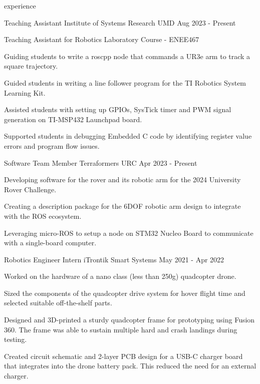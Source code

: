 \begin{section}{experience}

  \begin{work}
    {Teaching Assistant}
    {Institute of Systems Research}
    {UMD}
    {Aug 2023 - Present}

    \item Teaching Assistant for Robotics Laboratory Course - ENEE467
    \item Guiding students to write a roscpp node that commands a UR3e arm to track a square trajectory. 
    \item Guided students in writing a line follower program for the TI Robotics System Learning Kit.
    \item Assisted students with setting up GPIOs, SysTick timer and PWM signal generation on TI-MSP432 Launchpad board.
    \item Supported students in debugging Embedded C code by identifying register value errors and program flow issues.

  \end{work}

  \begin{work}
    {Software Team Member}
    {Terraformers URC}
    {}
    {Apr 2023 - Present}

    \item Developing software for the rover and its robotic arm for the 2024 University Rover Challenge.
    \item Creating a description package for the 6DOF robotic arm design to integrate with the ROS ecosystem.
    \item Leveraging micro-ROS to setup a node on STM32 Nucleo Board to communicate with a single-board computer.
  
  \end{work}

  \begin{work}
    {Robotics Engineer Intern}
    {iTrontik Smart Systems}
    {}
    {May 2021 - Apr 2022}

    \item Worked on the hardware of a nano class (less than 250g) quadcopter drone.
    \item Sized the components of the quadcopter drive system for hover flight time and selected suitable off-the-shelf parts. 
    \item Designed and 3D-printed a sturdy quadcopter frame for prototyping using Fusion 360. 
          The frame was able to sustain multiple hard and crash landings during testing.
    \item Created circuit schematic and 2-layer PCB design for a USB-C charger board that integrates into
          the drone battery pack. This reduced the need for an external charger.
  
  \end{work}

\end{section}